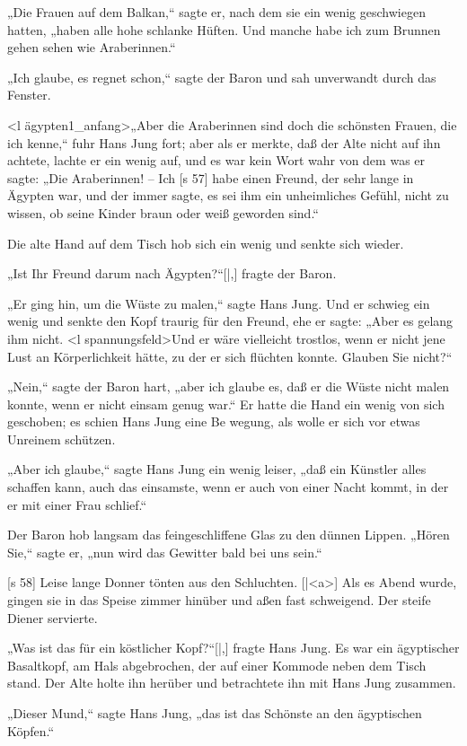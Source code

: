„Die Frauen auf dem Balkan,“ sagte er, nach­
dem sie ein wenig geschwiegen hatten, „haben alle
hohe schlanke Hüften. Und manche habe ich zum
Brunnen gehen sehen wie Araberinnen.“

„Ich glaube, es regnet schon,“ sagte der Baron
und sah unverwandt durch das Fenster.

<l ägypten1_anfang>„Aber die Araberinnen sind doch die schönsten
Frauen, die ich kenne,“ fuhr Hans Jung fort; aber
als er merkte, daß der Alte nicht auf ihn achtete,
lachte er ein wenig auf, und es war kein Wort wahr
von dem was er sagte: „Die Araberinnen! – Ich
[s 57]
habe einen Freund, der sehr lange in Ägypten war,
und der immer sagte, es sei ihm ein unheimliches
Gefühl, nicht zu wissen, ob seine Kinder braun oder
weiß geworden sind.“

Die alte Hand auf dem Tisch hob sich ein wenig
und senkte sich wieder.

„Ist Ihr Freund darum nach Ägypten?“[|,] fragte
der Baron.

„Er ging hin, um die Wüste zu malen,“ sagte
Hans Jung. Und er schwieg ein wenig und senkte
den Kopf traurig für den Freund, ehe er sagte: „Aber
es gelang ihm nicht. <l spannungsfeld>Und er wäre vielleicht trostlos,
wenn er nicht jene Lust an Körperlichkeit hätte, zu
der er sich flüchten konnte. Glauben Sie nicht?“

„Nein,“ sagte der Baron hart, „aber ich glaube es,
daß er die Wüste nicht malen konnte, wenn er nicht
einsam genug war.“ Er hatte die Hand ein wenig
von sich geschoben; es schien Hans Jung eine Be­
wegung, als wolle er sich vor etwas Unreinem schützen.

„Aber ich glaube,“ sagte Hans Jung ein wenig
leiser, „daß ein Künstler alles schaffen kann, auch
das einsamste, wenn er auch von einer Nacht kommt,
in der er mit einer Frau schlief.“

Der Baron hob langsam das feingeschliffene Glas
zu den dünnen Lippen. „Hören Sie,“ sagte er, „nun
wird das Gewitter bald bei uns sein.“

[s 58]
Leise lange Donner tönten aus den Schluchten.
[|<a>]
Als es Abend wurde, gingen sie in das Speise­
zimmer hinüber und aßen fast schweigend. Der steife
Diener servierte.

„Was ist das für ein köstlicher Kopf?“[|,] fragte
Hans Jung. Es war ein ägyptischer Basaltkopf, am
Hals abgebrochen, der auf einer Kommode neben
dem Tisch stand. Der Alte holte ihn herüber und
betrachtete ihn mit Hans Jung zusammen.

„Dieser Mund,“ sagte Hans Jung, „das ist das
Schönste an den ägyptischen Köpfen.“

